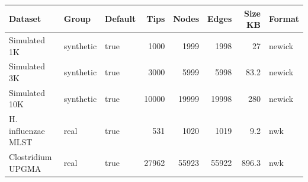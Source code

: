 \begin{tabular}{lllrrrrl}
\hline
Dataset & Group & Default & Tips & Nodes & Edges & Size KB & Format \\
\hline
Simulated 1K & synthetic & true & 1000 & 1999 & 1998 & 27 & newick \\
Simulated 3K & synthetic & true & 3000 & 5999 & 5998 & 83.2 & newick \\
Simulated 10K & synthetic & true & 10000 & 19999 & 19998 & 280 & newick \\
H. influenzae MLST & real & true & 531 & 1020 & 1019 & 9.2 & nwk \\
Clostridium UPGMA & real & true & 27962 & 55923 & 55922 & 896.3 & nwk \\
\hline
\end{tabular}
